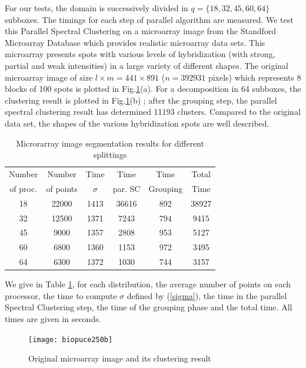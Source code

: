 \documentclass[runningheads,a4paper]{llncs}
\begin{document}
For our tests, the domain is successively divided in $q=\{18,32,45,60,64\}$
subboxes.
The timings for each step of parallel algorithm are measured. We test this
Parallel Spectral Clustering on a microarray image from the Standford
Microarray Database which provides realistic microarray data sets. This
microarray presents spots with various levels of hybridization (with strong,
partial and weak intensities) in a large variety of different shapes. 
 The original microarray image of size $l\times m=441 \times
891$ ($n=392 931$ pixels) which
represents 8 blocks of 100 spots is plotted in Fig.\ref{biopuceresult}(a).
For a decomposition in 64 subboxes, the clustering result is plotted in
Fig.\ref{biopuceresult}(b) ; after the grouping step, the parallel spectral
clustering result has determined 11193 clusters.
Compared to the original data set, the shapes of the various hybridization
spots are well described.

\begin{table}
\begin{center}
\begin{tabular}{|c||c||c|c|c||c|}
\hline
Number & Number & Time & Time & Time & Total  \\
of proc. & of points & $\sigma$ & par. SC & Grouping & Time \\
\hline
\hline
18 & 22000 & 1413 & 36616 & 892 & 38927 \\
32 & 12500 & 1371 & 7243  & 794 & 9415  \\
45  & 9000  & 1357 & 2808  & 953 & 5127  \\
60  & 6800  & 1360 & 1153  & 972 & 3495  \\
64 & 6300  & 1372 & 1030  & 744 & 3157  \\
\hline
\end{tabular}
\end{center}
\caption{Microrarray image segmentation results for different splittings} \label{biopuce_res}
\end{table}


We give in Table \ref{biopuce_res}, for each distribution, the average number
of points on each processor, the time to compute $\sigma$ defined by
(\ref{sigma}), the time in the parallel Spectral Clustering step, the time of
the grouping phase and the total time.
All times are given in seconds.

\begin{figure}
   \begin{center}
 {\texttt{[image: biopuce250b]}}
   \end{center}
   \caption{Original microarray image and its clustering result}  
   \label{biopuceresult}
 \end{figure}
\end{document}
